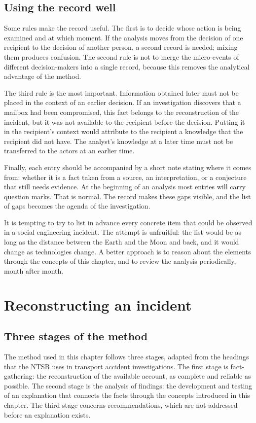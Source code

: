 \subsection{Using the record well}
Some rules make the record useful. The first is to decide whose action is being examined and at which moment. If the analysis moves from the decision of one recipient to the decision of another person, a second record is needed; mixing them produces confusion. The second rule is not to merge the micro-events of different decision-makers into a single record, because this removes the analytical advantage of the method.

The third rule is the most important. Information obtained later must not be placed in the context of an earlier decision. If an investigation discovers that a mailbox had been compromised, this fact belongs to the reconstruction of the incident, but it was not available to the recipient before the decision. Putting it in the recipient's context would attribute to the recipient a knowledge that the recipient did not have. The analyst's knowledge at a later time must not be transferred to the actors at an earlier time.

Finally, each entry should be accompanied by a short note stating where it comes from: whether it is a fact taken from a source, an interpretation, or a conjecture that still needs evidence. At the beginning of an analysis most entries will carry question marks. That is normal. The record makes these gaps visible, and the list of gaps becomes the agenda of the investigation.

It is tempting to try to list in advance every concrete item that could be observed in a social engineering incident. The attempt is unfruitful: the list would be as long as the distance between the Earth and the Moon and back, and it would change as technologies change. A better approach is to reason about the elements through the concepts of this chapter, and to review the analysis periodically, month after month.

\section{Reconstructing an incident}

\subsection{Three stages of the method}
The method used in this chapter follows three stages, adapted from the headings that the NTSB uses in transport accident investigations. The first stage is fact-gathering: the reconstruction of the available account, as complete and reliable as possible. The second stage is the analysis of findings: the development and testing of an explanation that connects the facts through the concepts introduced in this chapter. The third stage concerns recommendations, which are not addressed before an explanation exists.

